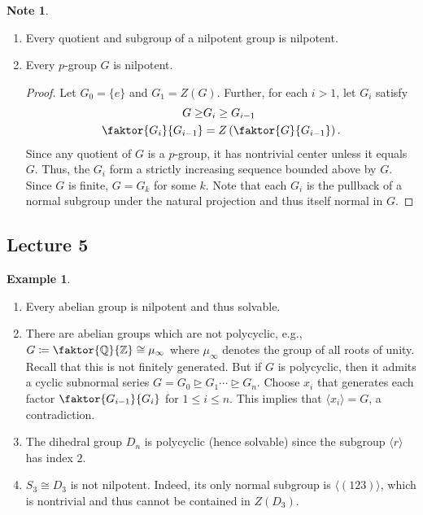 \documentclass[10pt,letterpaper,cm]{nupset}
\theoremstyle{definition}
\newtheorem{exmp}[definition]{Example}
\newtheorem{note}[definition]{Note}
\theoremstyle{theorem}
\theoremstyle{remark}
\newcommand{\Q}{\mathbb Q}
\newcommand{\Z}{\mathbb Z}
\newcommand{\1}{\mathbf{1}}
\newcommand{\0}{\vec 0}
\begin{document}
\begin{note} $ $
\begin{enumerate}
\item Every quotient and subgroup of a nilpotent group is nilpotent. 
\item Every $p$-group $G$ is nilpotent. 
\begin{proof}
Let $G_0 = \{e\}$ and $G_1 = Z(G)$. Further, for each $i>1$, let $G_{i}$ satisfy 
\begin{align*}
G  \geq & G_i \geq G_{i-1}
\\ \faktor{G_i}{G_{i-1}} & = Z\left(\faktor{G}{G_{i-1}}\right).
\end{align*}
 Since any quotient of $G$ is a $p$-group, it has nontrivial center unless it equals $G$.  Thus, the $G_i$ form a strictly increasing sequence bounded above by $G$. Since $G$ is finite, $G = G_k$ for some $k$. Note that each $G_i$ is the pullback of a normal subgroup under the natural projection and thus itself normal in $G$.
\end{proof}
\end{enumerate}
\end{note}

\subsection{Lecture 5}

\begin{exmp}  $ $
\begin{enumerate}
\item Every abelian group is nilpotent and thus solvable. 
\item There are abelian groups which are not polycyclic, e.g., $G\coloneqq \faktor{\Q}{\Z} \cong \mu_{\infty}$ where $\mu_{\infty}$ denotes the group of all roots of unity. Recall that this is  not finitely generated.  But if $G$ is polycyclic, then it admits a cyclic subnormal series $G = G_0 \unrhd G_1 \cdots \unrhd G_n$. Choose $x_i$ that generates each factor $\faktor{G_{i-1}}{G_i}$ for $1\leq i \leq n$.  This implies that $\langle x_i\rangle = G$, a contradiction. 
\item The dihedral group $D_n$ is polycyclic (hence solvable) since the subgroup $\langle r\rangle$ has index $2$.
\item $S_3\cong D_3$ is not nilpotent. Indeed, its only normal subgroup is $\langle (1 2 3)\rangle$, which is nontrivial and thus cannot be contained in $Z(D_3)$.
\end{enumerate}
\end{exmp}
\end{document}
